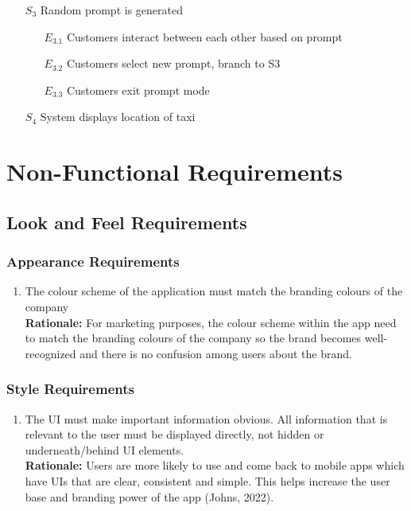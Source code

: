 \documentclass[]{article}
\begin{document}
\begin{enumerate}[{\textbf{BE}}1.]
\begin{enumerate}[{\textbf{VP7}}.1]
\begin{enumerate}
                \item[$S_3$] Random prompt is generated
                \begin{enumerate}
                    \item[$E_{3.1}$] Customers interact between each other based on prompt
                    \item[$E_{3.2}$] Customers select new prompt, branch to S3
                    \item[$E_{3.3}$] Customers exit prompt mode
                \end{enumerate}
\item[$S_4$] System displays location of taxi
            \end{enumerate}
    \end{enumerate}
\end{enumerate}

\section{Non-Functional Requirements}
\label{sec:non-functional_requirements}

\subsection{Look and Feel Requirements}
\label{sub:look_and_feel_requirements}

\subsubsection{Appearance Requirements}
\label{ssub:appearance_requirements}
\begin{enumerate}[{LF-A}1. ]
	\item The colour scheme of the application must match the branding colours of the company \\
	{\bf Rationale:} For marketing purposes, the colour scheme within the app need to match the branding colours of the company so the brand becomes well-recognized and there is no confusion among users about the brand.
\end{enumerate}

\subsubsection{Style Requirements}
\label{ssub:style_requirements}
\begin{enumerate}[{LF-S}1. ]
	\item The \color{red} UI must make important information obvious. All information that is relevant to the user must be displayed directly, not hidden or underneath/behind UI elements. \color{black} \\
	{\bf Rationale:} Users are more likely to use and come back to mobile apps which have UIs that are clear, consistent and simple. This helps increase the user base and branding power of the app (Johns, 2022). 
\end{enumerate}
\end{document}
